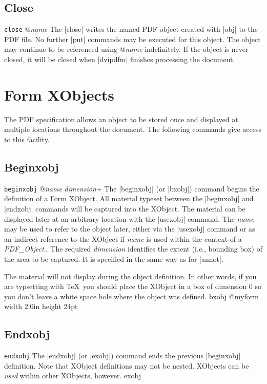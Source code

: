 {\subsection{Close}
\syntax
{\tt close} @{\it name}
\description
The |close| writes the named PDF object created with |obj| to the PDF file.
No further |put| commands may be executed for this object.
The object may continue to be referenced using @{\it name}
indefinitely.  If the object is never closed, it will
be closed when |dvipdfm| finishes processing the document.

\section{Form XObjects}
The PDF specification allows an object to be stored once
and displayed at multiple locations throughout the document.
The following commands give access to this facility.

\subsection{Beginxobj}
\syntax
{\tt beginxobj} @{\it name} {\it dimension}+
\description
The |beginxobj| (or |bxobj|) command begins the definition of
a Form XObject.  All material typeset between the
|beginxobj| and |endxobj| commands will be captured
into the XObject.  The material can be displayed later
at an arbitrary location with the |usexobj| command.
The {\it name} may be used to refer to the object later,
either via the |usexobj| command or as an indirect
reference to the XObject if {\it name} is
used within the context of a {\it PDF\_Object}..
The required {\it dimension} identifies the extent
(i.e., bounding box) of the area to be captured.
It is specified in the same way as for |annot|.

The material will not display during the object definition.
In other words, if you are typsetting with \TeX\ you
should place the XObject in a box of dimension 0 so
you don't leave a white space hole where the object was
defined.
\example
\begintt
bxobj @myform width 2.0in height 24pt
\endtt

\subsection{Endxobj}
\syntax
{\tt endxobj}
\description
The |endxobj| (or |exobj|) command ends the previous
|beginxobj| definition.  Note that XObject definitions
may not be nested.  XObjects can be {\it used} within
other XObjects, however.
\example
\begintt
exobj
\endtt

}
